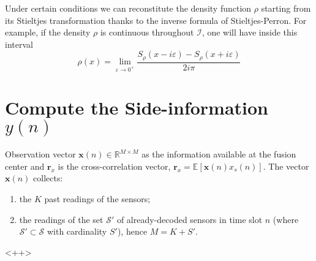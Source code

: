 Under certain conditions we can reconstitute the density function $\rho$ starting from its Stieltjes transformation thanks to the inverse formula of Stieltjes-Perron. For example, if the density $\rho$ is continuous throughout $\mathcal{I}$, one will have inside this interval
\begin{equation}
    \rho(x) = \lim_{\varepsilon \rightarrow 0^{+}} \dfrac{S_{\rho}(x-i\varepsilon) - S_{\rho}(x+i\varepsilon)}{2i\pi}
    \label{eq-Stieltjesinverse}
\end{equation}




\section{Compute the Side-information $y(n)$}
Observation vector $\mathbf{x}(n) \in \mathbb{R}^{M\times M}$ as the information available at the fusion center and $\mathbf{r}_x$ is the cross-correlation vector, $\mathbf{r}_x = \mathbb{E}[\mathbf{x}(n)x_s(n)]$. The vector $\mathbf{x}(n)$ collects: 
\begin{enumerate}
    \item the $K$ past readings of the sensors;
    \item the readings of the set $\mathcal{S}'$ of already-decoded sensors in time slot $n$ (where $\mathcal{S}' \subset \mathcal{S}$ with cardinality $S'$), hence $M = K+S'$. 
\end{enumerate}<++>
